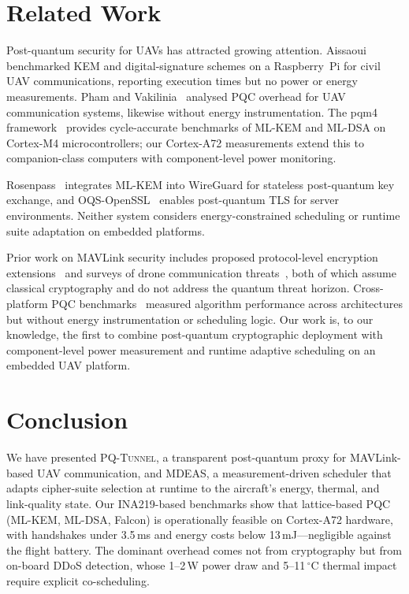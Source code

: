 \documentclass[conference]{IEEEtran}
\newcommand{\sysname}{\textsc{PQ\nobreakdash-Tunnel}}
\newcommand{\mdeas}{\textsc{MDEAS}}
\begin{document}
\section{Related Work}
\label{sec:related}

Post-quantum security for UAVs has attracted growing attention.
Aissaoui~\cite{aissaoui-drone} benchmarked KEM and digital-signature
schemes on a Raspberry~Pi for civil UAV communications, reporting
execution times but no power or energy measurements.
Pham and Vakilinia~\cite{drone-pqc-analysis} analysed PQC overhead
for UAV communication systems, likewise without energy
instrumentation.  The pqm4 framework~\cite{pqm4} provides
cycle-accurate benchmarks of ML-KEM and ML-DSA on Cortex-M4
microcontrollers; our Cortex-A72 measurements extend this to
companion-class computers with component-level power monitoring.

Rosenpass~\cite{rosenpass} integrates ML-KEM into WireGuard for
stateless post-quantum key exchange, and OQS-OpenSSL~\cite{liboqs}
enables post-quantum TLS for server environments.  Neither system
considers energy-constrained scheduling or runtime suite adaptation
on embedded platforms.

Prior work on MAVLink security includes proposed protocol-level
encryption extensions~\cite{mavlink-spec} and surveys of drone
communication threats~\cite{drone-security-survey}, both of which
assume classical cryptography and do not address the quantum threat
horizon.  Cross-platform PQC benchmarks~\cite{cross-platform-pqc}
measured algorithm performance across architectures but without
energy instrumentation or scheduling logic.  Our work is, to our
knowledge, the first to combine post-quantum cryptographic deployment
with component-level power measurement and runtime adaptive
scheduling on an embedded UAV platform.


\section{Conclusion}
\label{sec:conc}

We have presented \sysname{}, a transparent post-quantum proxy for
MAVLink-based UAV communication, and \mdeas{}, a measurement-driven
scheduler that adapts cipher-suite selection at runtime to the
aircraft's energy, thermal, and link-quality state.  Our INA219-based
benchmarks show that lattice-based PQC (ML-KEM, ML-DSA, Falcon) is
operationally feasible on Cortex-A72 hardware, with handshakes under
3.5\,ms and energy costs below 13\,mJ---negligible against the
flight battery.  The dominant overhead comes not from cryptography
but from on-board DDoS detection, whose 1--2\,W power draw and
5--11\,$^\circ$C thermal impact require explicit co-scheduling.
\end{document}
